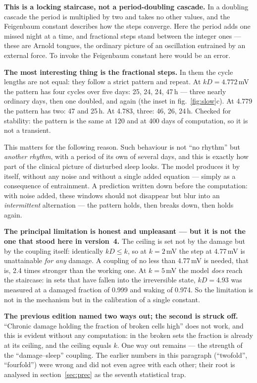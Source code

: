 \textbf{This is a locking staircase, not a period-doubling cascade.} In a doubling cascade the period is multiplied by two and takes no other values, and the Feigenbaum constant describes how the steps converge. Here the period adds one missed night at a time, and fractional steps stand between the integer ones --- these are Arnold tongues, the ordinary picture of an oscillation entrained by an external force. To invoke the Feigenbaum constant here would be an error.

\textbf{The most interesting thing is the fractional steps.} In them the cycle lengths are not equal: they follow a strict pattern and repeat. At $kD=4.772$\,mV the pattern has four cycles over five days: 25, 24, 24, 47\,h --- three nearly ordinary days, then one doubled, and again (the inset in fig.~\ref{fig:slow}c). At 4.779 the pattern has two: 47 and 25\,h. At 4.783, three: 46, 26, 24\,h. Checked for stability: the pattern is the same at 120 and at 400 days of computation, so it is not a transient.

This matters for the following reason. Such behaviour is not ``no rhythm'' but \emph{another rhythm}, with a period of its own of several days, and this is exactly how part of the clinical picture of disturbed sleep looks. The model produces it by itself, without any noise and without a single added equation --- simply as a consequence of entrainment. A prediction written down before the computation: with noise added, these windows should not disappear but blur into an \emph{intermittent} alternation --- the pattern holds, then breaks down, then holds again.

\textbf{The principal limitation is honest and unpleasant --- but it is not the one that stood here in version~4.} The ceiling is set not by the damage but by the coupling itself: identically $kD\le k$, so at $k=2$\,mV the step at 4.77\,mV is unattainable \emph{for any} damage. A coupling of no less than 4.77\,mV is needed, that is, 2.4 times stronger than the working one. At $k=5$\,mV the model \emph{does} reach the staircase: in sets that have fallen into the irreversible state, $kD=4.93$ was measured at a damaged fraction of 0.999 and waking of 0.974. So the limitation is not in the mechanism but in the calibration of a single constant.

\textbf{The previous edition named two ways out; the second is struck off.} ``Chronic damage holding the fraction of broken cells high'' does not work, and this is evident without any computation: in the broken sets the fraction is already at its ceiling, and the ceiling equals $k$. One way out remains --- the strength of the ``damage--sleep'' coupling. The earlier numbers in this paragraph (``twofold'', ``fourfold'') were wrong and did not even agree with each other; their root is analysed in section~\ref{sec:prec} as the seventh statistical trap.

